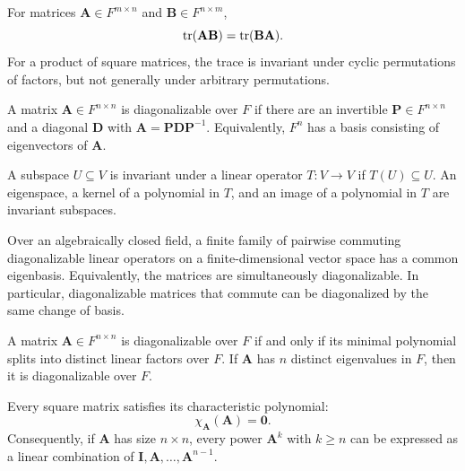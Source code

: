 \begin{theorem}
For matrices $\mathbf{A}\in F^{m\times n}$ and $\mathbf{B}\in F^{n\times m}$,
\[
 \operatorname{tr}(\mathbf{A}\mathbf{B})=\operatorname{tr}(\mathbf{B}\mathbf{A}).
\]
For a product of square matrices, the trace is invariant under cyclic permutations of factors, but not generally under arbitrary permutations.
\end{theorem}

\begin{definition}[Diagonalizability]
A matrix $\mathbf{A}\in F^{n\times n}$ is diagonalizable over $F$ if there are an invertible $\mathbf{P}\in F^{n\times n}$ and a diagonal $\mathbf{D}$ with $\mathbf{A}=\mathbf{P}\mathbf{D}\mathbf{P}^{-1}$. Equivalently, $F^n$ has a basis consisting of eigenvectors of $\mathbf{A}$.
\end{definition}


\begin{definition}
A subspace $U\subseteq V$ is invariant under a linear operator $T\colon V\to V$ if $T(U)\subseteq U$. An eigenspace, a kernel of a polynomial in $T$, and an image of a polynomial in $T$ are invariant subspaces.
\end{definition}
\begin{theorem}
Over an algebraically closed field, a finite family of pairwise commuting diagonalizable linear operators on a finite-dimensional vector space has a common eigenbasis. Equivalently, the matrices are simultaneously diagonalizable. In particular, diagonalizable matrices that commute can be diagonalized by the same change of basis.
\end{theorem}

\begin{theorem}
A matrix $\mathbf{A}\in F^{n\times n}$ is diagonalizable over $F$ if and only if its minimal polynomial splits into distinct linear factors over $F$. If $\mathbf{A}$ has $n$ distinct eigenvalues in $F$, then it is diagonalizable over $F$.
\end{theorem}

\begin{theorem}
Every square matrix satisfies its characteristic polynomial:
\[
 \chi_{\mathbf{A}}(\mathbf{A})=\mathbf0.
\]
Consequently, if $\mathbf{A}$ has size $n\times n$, every power $\mathbf{A}^k$ with $k\ge n$ can be expressed as a linear combination of
$\mathbf{I},\mathbf{A},\dots,\mathbf{A}^{n-1}$.
\end{theorem}

